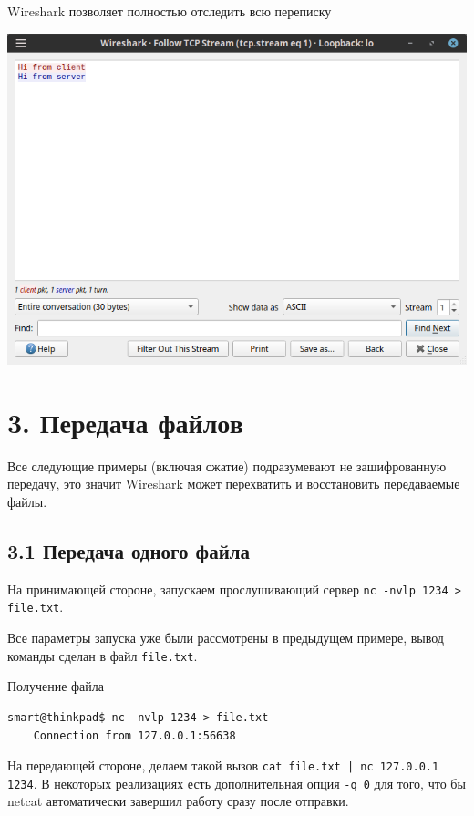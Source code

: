 Wireshark позволяет полностью отследить всю переписку
\begin{center}
    \includegraphics[scale=0.55]{res/7.wireshark-nc-follow.png}
\end{center}

\section*{3. Передача файлов}

Все следующие примеры (включая сжатие) подразумевают не зашифрованную передачу, это значит Wireshark может перехватить и восстановить передаваемые файлы.

\subsection*{3.1 Передача одного файла}

На принимающей стороне, запускаем прослушивающий сервер \texttt{nc -nvlp 1234 > file.txt}.

Все параметры запуска уже были рассмотрены в предыдущем примере, вывод команды сделан в файл \texttt{file.txt}.

Получение файла
\begin{Verbatim}[frame=single]
    smart@thinkpad$ nc -nvlp 1234 > file.txt
    Connection from 127.0.0.1:56638
\end{Verbatim}

На передающей стороне, делаем такой вызов \texttt{cat file.txt | nc 127.0.0.1 1234}. В некоторых реализациях есть дополнительная опция \texttt{-q 0} для того, что бы netcat автоматически завершил работу сразу после отправки.

